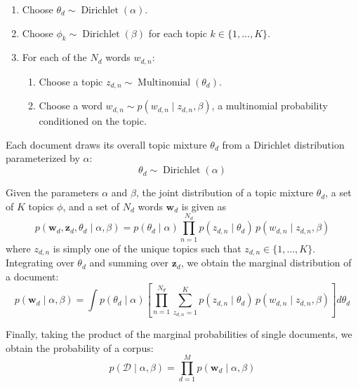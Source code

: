 \documentclass[12pt,a4paper]{report}
\begin{document}
\begin{enumerate}[label=\arabic*.]
  \item Choose $\theta_d \sim \operatorname{Dirichlet}(\alpha)$.
  \item Choose $\phi_k \sim \operatorname{Dirichlet}(\beta)$ for each topic
        $k \in \{1,\dots,K\}$.
  \item For each of the $N_d$ words $w_{d,n}$:
        \begin{enumerate}[label=\alph*.]
          \item Choose a topic $z_{d,n} \sim \operatorname{Multinomial}(\theta_d)$.
          \item Choose a word $w_{d,n} \sim p(w_{d,n} \mid z_{d,n}, \beta)$, a
                multinomial probability conditioned on the topic.
        \end{enumerate}
\end{enumerate}

Each document draws its overall topic mixture $\theta_d$ from a Dirichlet
distribution parameterized by $\alpha$:
\begin{equation}
  \theta_d \sim \operatorname{Dirichlet}(\alpha)
  \label{eq:lda-theta}
\end{equation}

Given the parameters $\alpha$ and $\beta$, the joint distribution of a topic
mixture $\theta_d$, a set of $K$ topics $\phi$, and a set of $N_d$ words
$\mathbf{w}_d$ is given as
\begin{equation}
  p(\mathbf{w}_d, \mathbf{z}_d, \theta_d \mid \alpha, \beta)
  = p(\theta_d \mid \alpha)
    \prod_{n=1}^{N_d}
    p(z_{d,n} \mid \theta_d)\,
    p(w_{d,n} \mid z_{d,n}, \beta)
  \label{eq:lda-joint}
\end{equation}
where $z_{d,n}$ is simply one of the unique topics such that
$z_{d,n} \in \{1,\dots,K\}$. Integrating over $\theta_d$ and summing over
$\mathbf{z}_d$, we obtain the marginal distribution of a document:
\begin{equation}
  p(\mathbf{w}_d \mid \alpha, \beta)
  = \int p(\theta_d \mid \alpha)
    \left[
      \prod_{n=1}^{N_d}
      \sum_{z_{d,n}=1}^{K}
      p(z_{d,n} \mid \theta_d)\,
      p(w_{d,n} \mid z_{d,n}, \beta)
    \right]
    d\theta_d
  \label{eq:lda-marginal}
\end{equation}

Finally, taking the product of the marginal probabilities of single documents,
we obtain the probability of a corpus:
\begin{equation}
  p(\mathcal{D} \mid \alpha, \beta)
  = \prod_{d=1}^{M} p(\mathbf{w}_d \mid \alpha, \beta)
  \label{eq:lda-corpus}
\end{equation}
\end{document}
